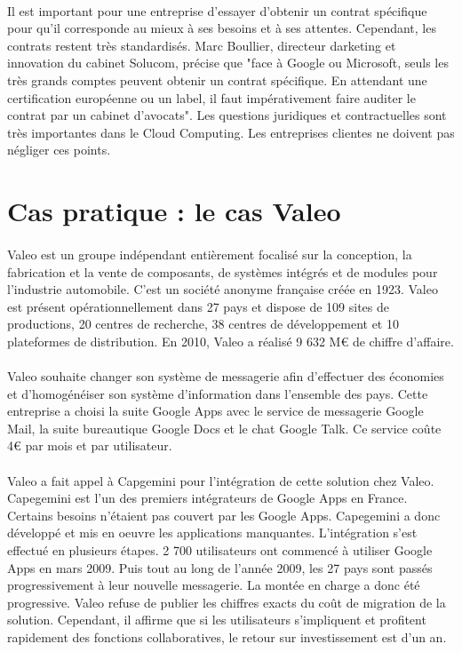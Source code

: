 \documentclass[a4paper,12pt]{report}
\begin{document}
\begin{onehalfspace}
	\paragraph*{}
	Il est important pour une entreprise d’essayer d’obtenir un contrat spécifique pour qu’il corresponde au mieux à ses besoins et à ses attentes. Cependant, les contrats restent très standardisés. Marc Boullier, directeur darketing et innovation du cabinet Solucom, précise que "face à Google ou Microsoft, seuls les très grands comptes peuvent obtenir un contrat spécifique. En attendant une certification européenne ou un label, il faut impérativement faire auditer le contrat par un cabinet d'avocats".
Les questions juridiques et contractuelles sont très importantes dans le Cloud Computing. Les entreprises clientes ne doivent pas négliger ces points.


	\section{Cas pratique : le cas Valeo}

	\paragraph*{}
	Valeo est un groupe indépendant entièrement focalisé sur la conception, la fabrication et la vente de composants, de systèmes intégrés et de modules pour l’industrie automobile. C’est un société anonyme française créée en 1923. Valeo est présent opérationnellement dans 27 pays et dispose de 109 sites de productions, 20 centres de recherche, 38 centres de développement et 10 plateformes de distribution. En 2010, Valeo a réalisé 9 632 M\euro{} de chiffre d’affaire.
	\paragraph*{}
	Valeo souhaite changer son système de messagerie afin d’effectuer des économies et d'homogénéiser son système d’information dans l’ensemble des pays. Cette entreprise a choisi la suite Google Apps avec le service de messagerie Google Mail, la suite bureautique Google Docs et le chat Google Talk. Ce service coûte 4\euro{} par mois et par utilisateur.
	\paragraph*{}
	Valeo a fait appel à Capgemini pour l’intégration de cette solution chez Valeo. Capegemini est l’un des premiers intégrateurs de Google Apps en France. Certains besoins n’étaient pas couvert par les Google Apps. Capegemini a donc développé et mis en oeuvre les applications manquantes. L’intégration s’est effectué en plusieurs étapes. 2 700 utilisateurs ont commencé à utiliser Google Apps en mars 2009. Puis tout au long de l’année 2009, les 27 pays sont passés progressivement à leur nouvelle messagerie. La montée en charge a donc été progressive. Valeo refuse de publier les chiffres exacts du coût de migration de la solution. Cependant, il affirme que si les utilisateurs s’impliquent et profitent rapidement des fonctions collaboratives, le retour sur investissement est d'un an.

\end{onehalfspace}
\end{document}
